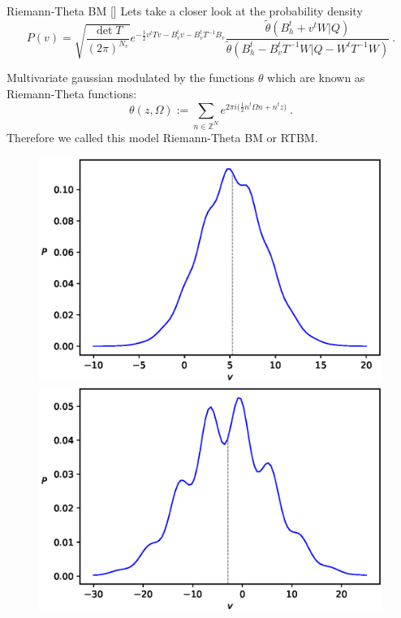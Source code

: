 \documentclass[10pt]{beamer}
\begin{document}
\begin{frame}{Riemann-Theta BM \hfill \small [\cite{2020}]}
    Lets take a closer look at the probability density
    \begin{equation*}
        P(v) = \sqrt{\frac{\det T}{(2\pi)^{N_v}}} e^{- \frac{1}{2} v^t T v - B_v^t v - B_v^t T^{-1} B_v}
            \frac{\tilde{\theta}(B^t_h+v^t W \vert Q)}
            {\tilde{\theta}(B^t_h-B_v^t T^{-1} W \vert Q - W^t T^{-1} W)} \ .
    \end{equation*}
    
    Multivariate gaussian modulated by the functions $\theta$ which are known as
    Riemann-Theta functions:
    \begin{equation*}
        \theta ( z, \Omega) :=
        \sum_{n \in \mathbb{Z}^N} e^{2 \pi i \big( \frac{1}{2}n^t \Omega n + n^t z \big)} \ .
    \end{equation*}
    Therefore we called this model Riemann-Theta BM or RTBM.
    \begin{figure}
        \begin{center}
          \includegraphics[scale=0.25]{figures/PvPhaseI-1}
          \includegraphics[scale=0.25]{figures/PvPhaseI-2}

\end{center}
\end{figure}
\end{frame}
\end{document}
